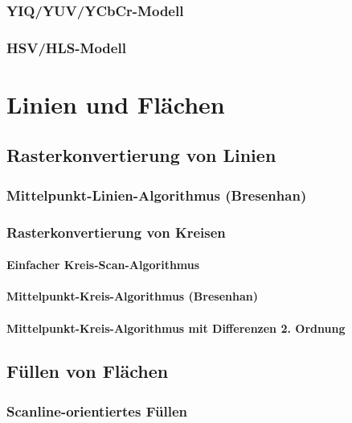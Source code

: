 \subsection{YIQ/YUV/YCbCr-Modell}
\subsection{HSV/HLS-Modell}

\chapter{Linien und Flächen}
\section{Rasterkonvertierung von Linien}

\subsection{Mittelpunkt-Linien-Algorithmus (Bresenhan)}

\subsection{Rasterkonvertierung von Kreisen}
\subsubsection{Einfacher Kreis-Scan-Algorithmus}
\subsubsection{Mittelpunkt-Kreis-Algorithmus (Bresenhan)}
\subsubsection{Mittelpunkt-Kreis-Algorithmus mit Differenzen 2. Ordnung}
\section{Füllen von Flächen}
\subsection{Scanline-orientiertes Füllen}

